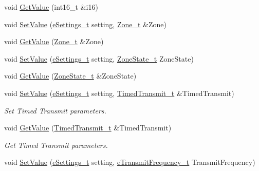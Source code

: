 \begin{DoxyCompactItemize}
\item 
void \mbox{\hyperlink{struct_quantum_lib_1_1_setting_data__t_adc022298ee04cd323b3eda801c88790a}{Get\+Value}} (int16\+\_\+t \&i16)
\item 
void \mbox{\hyperlink{struct_quantum_lib_1_1_setting_data__t_aff47f27bbe9d26df6824c7833d215146}{Set\+Value}} (\mbox{\hyperlink{namespace_quantum_lib_acc8124e3e65bca4aa798d03a55e3d54c}{e\+Settings\+\_\+t}} setting, \mbox{\hyperlink{struct_quantum_lib_1_1_zone__t}{Zone\+\_\+t}} \&Zone)
\item 
void \mbox{\hyperlink{struct_quantum_lib_1_1_setting_data__t_ac1eebb9cc1e21cc026715073940248f4}{Get\+Value}} (\mbox{\hyperlink{struct_quantum_lib_1_1_zone__t}{Zone\+\_\+t}} \&Zone)
\item 
void \mbox{\hyperlink{struct_quantum_lib_1_1_setting_data__t_a34738db08f04aa469441eb61f9705f6d}{Set\+Value}} (\mbox{\hyperlink{namespace_quantum_lib_acc8124e3e65bca4aa798d03a55e3d54c}{e\+Settings\+\_\+t}} setting, \mbox{\hyperlink{struct_quantum_lib_1_1_zone_state__t}{Zone\+State\+\_\+t}} Zone\+State)
\item 
void \mbox{\hyperlink{struct_quantum_lib_1_1_setting_data__t_ae617bc2f4a9f18f508bd872c5aa4cf7f}{Get\+Value}} (\mbox{\hyperlink{struct_quantum_lib_1_1_zone_state__t}{Zone\+State\+\_\+t}} \&Zone\+State)
\item 
void \mbox{\hyperlink{struct_quantum_lib_1_1_setting_data__t_a0ab8eb9c1f7f021ed505e717cdfa3dec}{Set\+Value}} (\mbox{\hyperlink{namespace_quantum_lib_acc8124e3e65bca4aa798d03a55e3d54c}{e\+Settings\+\_\+t}} setting, \mbox{\hyperlink{struct_quantum_lib_1_1_timed_transmit__t}{Timed\+Transmit\+\_\+t}} \&Timed\+Transmit)
\begin{DoxyCompactList}\small\item\em Set Timed Transmit parameters. \end{DoxyCompactList}\item 
void \mbox{\hyperlink{struct_quantum_lib_1_1_setting_data__t_a039c28a4b47a2e4f5f527a6d3aac789f}{Get\+Value}} (\mbox{\hyperlink{struct_quantum_lib_1_1_timed_transmit__t}{Timed\+Transmit\+\_\+t}} \&Timed\+Transmit)
\begin{DoxyCompactList}\small\item\em Get Timed Transmit parameters. \end{DoxyCompactList}\item 
void \mbox{\hyperlink{struct_quantum_lib_1_1_setting_data__t_abaf2b3d8b13e25f2e1873a196aa2be74}{Set\+Value}} (\mbox{\hyperlink{namespace_quantum_lib_acc8124e3e65bca4aa798d03a55e3d54c}{e\+Settings\+\_\+t}} setting, \mbox{\hyperlink{namespace_quantum_lib_af636ea7f14f5a62bfcfc1132c9c78019}{e\+Transmit\+Frequency\+\_\+t}} Transmit\+Frequency)

\end{DoxyCompactItemize}
